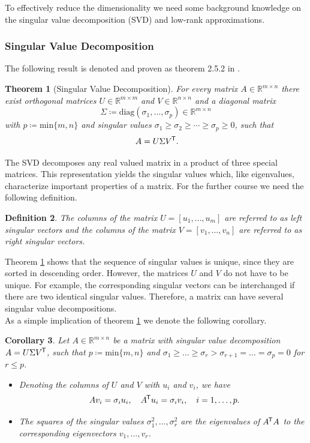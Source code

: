 \documentclass[11pt, a4paper]{article}
\newtheorem{theorem}{Theorem}[section]
\newtheorem{corollary}[theorem]{Corollary}
\newtheorem{definition}[theorem]{Definition}
\newcommand{\R}{\mathbb{R}}
\newcommand*{\tr}{^{\mkern-1.5mu\mathsf{T}}}
\begin{document}
To effectively reduce the dimensionality we need some background knowledge on the singular value decomposition (SVD) and low-rank approximations.

\subsubsection{Singular Value Decomposition}

The following result is denoted and proven as theorem 2.5.2 in \cite{SVD}.

\begin{theorem}[Singular Value Decomposition] \label{thm:svd}
For every matrix $A \in \R^{m \times n}$ there exist orthogonal matrices $U \in \R^{m \times m}$ and $V \in \R^{n \times n}$ and a diagonal matrix 
\[ \Sigma \coloneq \text{diag}(\sigma_1, \dots, \sigma_p) \in \R^{m \times n} \]
with $p \coloneq \text{min} \{ m,n \}$ and singular values $\sigma_1 \geq \sigma_2 \geq \cdots \geq \sigma_p \geq 0$, such that
\[ A = U \Sigma V\tr . \]
\end{theorem}

The SVD decomposes any real valued matrix in a product of three special matrices. This representation yields the singular values which, like eigenvalues, characterize important properties of a matrix. For the further course we need the following definition.

\begin{definition}
The columns of the matrix $U = [u_1, \dots, u_m]$ are referred to as left singular vectors and the columns of the matrix $V = [v_1, \dots, v_n]$ are referred to as right singular vectors.
\end{definition}

Theorem \ref{thm:svd} shows that the sequence of singular values is unique, since they are sorted in descending order. However, the matrices $U$ and $V$ do not have to be unique. For example, the corresponding singular vectors can be interchanged if there are two identical singular values. Therefore, a matrix can have several singular value decompositions. \\

As a simple implication of theorem \ref{thm:svd} we denote the following corollary.

\begin{corollary} \label{cor:svd}
Let $A \in \R^{m \times n}$ be a matrix with singular value decomposition $A=U \Sigma V\tr $, such that $p \coloneq \text{min}\{m,n\}$ and $\sigma_1 \geq \dots \geq \sigma_r > \sigma_{r+1} = \dots = \sigma_p = 0$ for $r \leq p$.
\begin{itemize}
\item[1.] Denoting the columns of $U$ and $V$ with $u_i$ and $v_i$, we have
\[ A v_i = \sigma_i u_i, \quad A\tr  u_i = \sigma_i v_i, \quad i=1,\dots,p.\]
\item[2.] The squares of the singular values $\sigma_1^2, \dots, \sigma_r^2$ are the eigenvalues of $A\tr A$ to the corresponding eigenvectors $v_1, \dots, v_r$.
\end{itemize}
\end{corollary}
\end{document}

